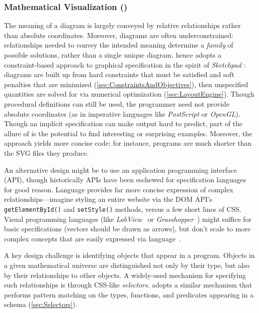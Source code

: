 \subsubsection{Mathematical Visualization (\Style{})}
\label{sec:MathematicalVisualization}


The meaning of a diagram is largely conveyed by relative relationships rather than absolute coordinates.  Moreover, diagrams are often underconstrained: relationships needed to convey the intended meaning determine a \emph{family} of possible solutions, rather than a single unique diagram.  \Style{} hence adopts a constraint-based approach to graphical specification in the spirit of \emph{Sketchpad} \cite{sketchpad}: diagrams are built up from hard constraints that must be satisfied and soft penalties that are minimized (\cref{sec:ConstraintsAndObjectives}), then unspecified quantities are solved for via numerical optimization (\cref{sec:LayoutEngine}).  Though procedural definitions can still be used, the programmer need not provide absolute coordinates (as in imperative languages like \emph{PostScript} or \emph{OpenGL}).  Though an implicit specification can make output hard to predict, part of the allure of \Penrose{} is the potential to find interesting or surprising examples.  Moreover, the approach yields more concise code; for instance, \Style{} programs are much shorter than the SVG files they produce.

An alternative design might be to use an application programming interface (API), though historically APIs have been eschewed for specification languages for good reason. Language provides far more concise expression of complex relationships---imagine styling an entire website via the DOM API's \texttt{getElementById()} and \texttt{setStyle()} methods, versus a few short lines of CSS. Visual programming languages (like \emph{LabView}~\cite{Elliott:2007:NIL} or \emph{Grasshopper}~\cite{McNeel:2010:GGM}) might suffice for basic specifications (\eg vectors should be drawn as arrows), but don't scale to more complex concepts that are easily expressed via language~\cite{Burnett:1995:SUV}.

A key design challenge is identifying objects that appear in a \Substance{} program.  Objects in a given mathematical universe are distinguished not only by their type, but also by their relationships to other objects.  A widely-used mechanism for specifying such relationships is through CSS-like \emph{selectors}. \Style{} adopts a similar mechanism that performs pattern matching on the types, functions, and predicates appearing in a \Domain{} schema (\cref{sec:Selectors}).


